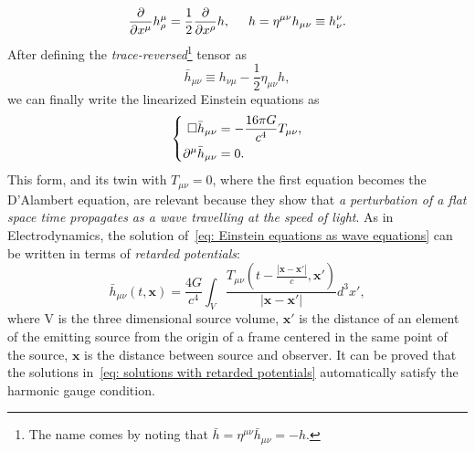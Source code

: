 \begin{equation}
    \frac{\partial}{\partial x^\mu}h^\mu_\rho = \frac{1}{2}\frac
    {\partial}{\partial x^\rho}h, \hspace{5mm} h=\eta^{\mu\nu}h_{\mu\nu}\equiv h^\nu_\nu.
\end{equation}
After defining the \textit{trace-reversed}\footnote{The name comes by noting that $\bar{h}=\eta^{\mu\nu}\bar{h}_{\mu\nu} = -h$.} tensor as
\begin{equation*}
    \bar{h}_{\mu\nu} \equiv h_{\nu\mu} - \frac{1}{2}\eta_{\mu\nu}h,
\end{equation*}
we can finally write the linearized Einstein equations as
\begin{equation}
    \left\{
        \begin{aligned}
            \square\bar{h}_{\mu\nu} &= -\frac{16\pi G}{c^4} T_{\mu\nu}, 
            \notag\\
            \partial^\mu \bar{h}_{\mu\nu} &= 0.
        \end{aligned}
    \right.
    \label{eq: Einstein equations as wave equations}
\end{equation}
This form, and its twin with $T_{\mu\nu}=0$, where the first equation becomes the D'Alambert equation, are relevant because they show that \textit{a perturbation of a flat space time propagates as a wave travelling at the speed of light}.
As in Electrodynamics, the solution of~\eqref{eq: Einstein equations as wave equations} can be written in terms of \textit{retarded potentials}:
\begin{equation}
    \bar{h}_{\mu\nu}(t,\mathbf{x}) = \frac{4G}{c^4}\int_V \frac{T_{\mu\nu}(t - \frac{|\mathbf{x} - \mathbf{x}'|}{c}, \mathbf{x}')}{|\mathbf{x} - \mathbf{x}'|}d^3x',
    \label{eq: solutions with retarded potentials}
\end{equation}
where V is the three dimensional source volume, $\mathbf{x}'$ is the distance of an element of the emitting source from the origin of a frame centered in the same point of the source, $\mathbf{x}$ is the distance between source and observer.
It can be proved that the solutions in~\eqref{eq: solutions with retarded potentials} automatically satisfy the harmonic gauge condition.

